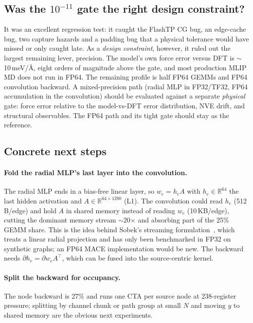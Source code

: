 \subsection{Was the $10^{-11}$ gate the right design constraint?}
It was an excellent regression test: it caught the FlashTP CG bug, an edge-cache bug, two capture hazards and a padding bug that a physical tolerance would have missed or only caught late. As a \emph{design constraint}, however, it ruled out the largest remaining lever, precision. The model's own force error versus DFT is $\sim$10\,meV/\AA, eight orders of magnitude above the gate, and most production MLIP MD does not run in FP64. The remaining profile is half FP64 GEMMs and FP64 convolution backward. A mixed-precision path (radial MLP in FP32/TF32, FP64 accumulation in the convolution) should be evaluated against a separate \emph{physical} gate: force error relative to the model-vs-DFT error distribution, NVE drift, and structural observables. The FP64 path and its tight gate should stay as the reference.

\subsection{Concrete next steps}
\paragraph{Fold the radial MLP's last layer into the convolution.} The radial MLP ends in a bias-free linear layer, so $w_e = h_e A$ with $h_e\in\mathbb R^{64}$ the last hidden activation and $A\in\mathbb R^{64\times1280}$ (L1). The convolution could read $h_e$ (512\,B/edge) and hold $A$ in shared memory instead of reading $w_e$ (10\,KB/edge), cutting the dominant memory stream $\sim$20$\times$ and absorbing part of the 25\% GEMM share. This is the idea behind Sobek's streaming formulation~\cite{sobek}, which treats a linear radial projection and has only been benchmarked in FP32 on synthetic graphs; an FP64 MACE implementation would be new. The backward needs $\partial h_e = \partial w_e A^\top$, which can be fused into the source-centric kernel.
\paragraph{Split the backward for occupancy.} The node backward is 27\% and runs one CTA per source node at 238-register pressure; splitting by channel chunk or path group at small $N$ and moving $y$ to shared memory are the obvious next experiments.
